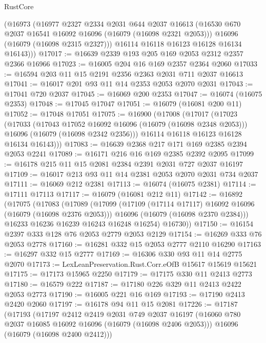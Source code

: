 \begin{lexlean}{RustCore}
\begin{coremodule}
        (@16973
          (@16977
            @2327
            @2334
            @2031
            @644
            @2037
            @16613
            (@16530 @670 @2037 @16541 @16092 @16096 (@16079 (@16098 @2321 @2053)))
            @16096
            (@16079 (@16098 @2315 @2327)))
          @16114
          @16118
          @16123
          @16128
          @16134
          @16143)))
@17017 := @16639 @2339 @193 @205 @169 @2053 @2312 @2357 @2366 @16966
@17023 := @16005 @204 @16 @169 @2357 @2364 @2060
@17033 := @16594 @203 @11 @15 @2191 @2356 @2363 @2031 @711 @2037 @16613
@17041 := @16017 @201 @93 @11 @14 @2353 @2053 @2070 @2031
@17043 := @17041 @720 @2037
@17045 := @16069 @200 @2353
@17047 := @16074 (@16075 @2353)
@17048 := @17045 @17047
@17051 := @16079 (@16081 @200 @11)
@17052 := @17048 @17051
@17075 := @16900
    (@17008
      (@17017
        (@17023
          (@17033
            (@17043 @17052 @16092 @16096 (@16079 (@16098 @2348 @2053)))
            @16096
            (@16079 (@16098 @2342 @2356)))
          @16114
          @16118
          @16123
          @16128
          @16134
          @16143)))
@17083 := @16639 @2368 @217 @171 @169 @2385 @2394 @2053 @2241
@17089 := @16171 @216 @16 @169 @2385 @2392 @2095
@17099 := @16178 @215 @11 @15 @2081 @2384 @2391 @2031 @727 @2037 @16197
@17109 := @16017 @213 @93 @11 @14 @2381 @2053 @2070 @2031 @734 @2037
@17111 := @16069 @212 @2381
@17113 := @16074 (@16075 @2381)
@17114 := @17111 @17113
@17117 := @16079 (@16081 @212 @11)
@17142 := @16892
    (@17075
      (@17083
        (@17089
          (@17099
            (@17109 (@17114 @17117) @16092 @16096 (@16079 (@16098 @2376 @2053)))
            @16096
            (@16079 (@16098 @2370 @2384)))
          @16233
          @16236
          @16239
          @16243
          @16248
          @16254)
        @16730))
@17150 := @16154 @2397 @333 @128 @76 @2053 @2779 @2053 @2129
@17154 := @16269 @333 @76 @2053 @2778
@17160 := @16281 @332 @15 @2053 @2777 @2110 @16290
@17163 := @16297 @332 @15 @2777
@17169 := @16306 @330 @93 @11 @14 @2775 @2070
@17173 := LexLeanPreservation.Rust.Corr.eOfB @15617 @15619 @15621
@17175 := @17173 @15965 @2250
@17179 := @17175 @330 @11 @2413 @2773
@17180 := @16579 @222
@17187 := @17180 @226 @329 @11 @2413 @2422 @2053 @2773
@17190 := @16005 @221 @16 @169
@17193 := @17190 @2413 @2420 @2060
@17197 := @16178 @94 @11 @15 @2081
@17226 := @17187
    (@17193
      (@17197
        @2412
        @2419
        @2031
        @749
        @2037
        @16197
        (@16060 @780 @2037 @16085 @16092 @16096 (@16079 (@16098 @2406 @2053)))
        @16096
        (@16079 (@16098 @2400 @2412)))

\end{coremodule}
\end{lexlean}
